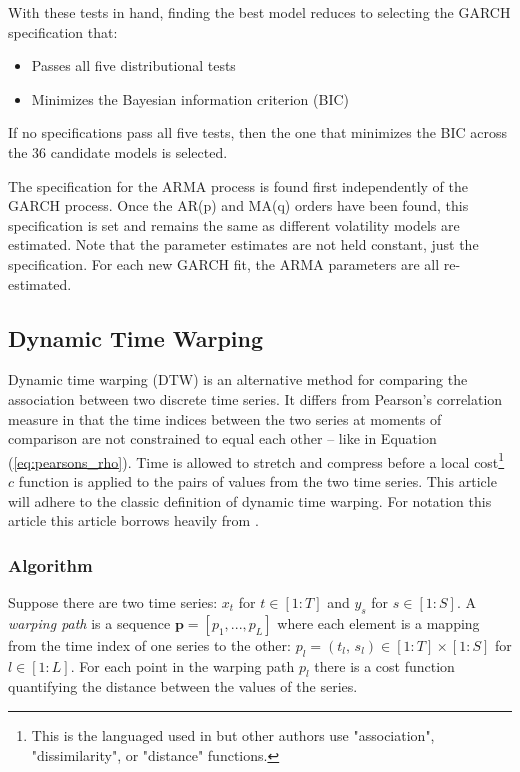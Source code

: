 \documentclass[12pt]{article}
\begin{document}
\begin{enumerate}
    With these tests in hand, finding the best model reduces to selecting the GARCH specification that:
    
    \begin{itemize}
        \item Passes all five distributional tests
        \item Minimizes the Bayesian information criterion (BIC)
    \end{itemize}

    If no specifications pass all five tests, then the one that minimizes the BIC across the 36 candidate models is selected.

\end{enumerate}

The specification for the ARMA process is found first independently of the GARCH process. Once the AR(p) and MA(q) orders have been found, this specification is set and remains the same as different volatility models are estimated. Note that the parameter estimates are not held constant, just the specification. For each new GARCH fit, the ARMA parameters are all re-estimated.


\subsection{Dynamic Time Warping} \label{sec:DTW}

Dynamic time warping (DTW) is an alternative method for comparing the association between two discrete time series. It differs from Pearson's correlation measure in that the time indices between the two series at moments of comparison are not constrained to equal each other -- like in Equation (\ref{eq:pearsons_rho}). Time is allowed to stretch and compress before a local cost\footnote{This is the languaged used in \cite{Mueller2007} but other authors use "association", "dissimilarity", or "distance" functions.} $c$ function is applied to the pairs of values from the two time series. This article will adhere to the classic definition of dynamic time warping. For notation this article this article borrows heavily from \cite{Mueller2007}.

\subsubsection{Algorithm} \label{sec:DTW_Algorithm}

Suppose there are two time series: $x_{t}$ for $t \in [1:T]$ and $y_{s}$ for $s \in [1:S]$. A \emph{warping path} is a sequence $\boldsymbol{p} = [p_{1},..., p_{L}]$ where each element is a mapping from the time index of one series to the other: $p_{l} = (t_{l}, \, s_{l}) \in [1:T] \times [1:S]$ for $l \in [1:L]$. For each point in the warping path $p_{l}$ there is a cost function quantifying the distance between the values of the series.
\end{document}
